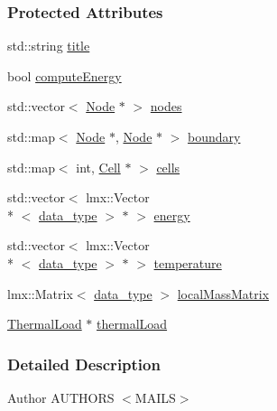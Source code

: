 \subsubsection*{Protected Attributes}
\begin{DoxyCompactItemize}
\item 
std\-::string \hyperlink{classmknix_1_1_thermal_body_ad1b2b790274d2c987a8c461da0a3282f}{title}
\item 
bool \hyperlink{classmknix_1_1_thermal_body_a097e16dfcc1491dc659608f1392a504f}{compute\-Energy}
\item 
std\-::vector$<$ \hyperlink{classmknix_1_1_node}{Node} $\ast$ $>$ \hyperlink{classmknix_1_1_thermal_body_aa74c56a18ed24997dfc4bdb90a7f67bd}{nodes}
\item 
std\-::map$<$ \hyperlink{classmknix_1_1_node}{Node} $\ast$, \hyperlink{classmknix_1_1_node}{Node} $\ast$ $>$ \hyperlink{classmknix_1_1_thermal_body_accad269fb2f0b891c66633011d396cfa}{boundary}
\item 
std\-::map$<$ int, \hyperlink{classmknix_1_1_cell}{Cell} $\ast$ $>$ \hyperlink{classmknix_1_1_thermal_body_a2af2b78c8e31929211f88a5a49072c06}{cells}
\item 
std\-::vector$<$ lmx\-::\-Vector\\*
$<$ \hyperlink{namespacemknix_a16be4b246fbf2cceb141e3a179111020}{data\-\_\-type} $>$ $\ast$ $>$ \hyperlink{classmknix_1_1_thermal_body_aa5aa347f85714ea0766e2c1fddab4dad}{energy}
\item 
std\-::vector$<$ lmx\-::\-Vector\\*
$<$ \hyperlink{namespacemknix_a16be4b246fbf2cceb141e3a179111020}{data\-\_\-type} $>$ $\ast$ $>$ \hyperlink{classmknix_1_1_thermal_body_af5ed33528eba7a3bf39a4bdc3d2c9ed3}{temperature}
\item 
lmx\-::\-Matrix$<$ \hyperlink{namespacemknix_a16be4b246fbf2cceb141e3a179111020}{data\-\_\-type} $>$ \hyperlink{classmknix_1_1_thermal_body_a7ef0f85e0f2dac9fbdb23f23f16abb69}{local\-Mass\-Matrix}
\item 
\hyperlink{classmknix_1_1_thermal_load}{Thermal\-Load} $\ast$ \hyperlink{classmknix_1_1_thermal_body_abbac7355fca5db72ce619bb327c1514c}{thermal\-Load}
\end{DoxyCompactItemize}


\subsubsection{Detailed Description}
\begin{DoxyAuthor}{Author}
A\-U\-T\-H\-O\-R\-S $<$\-M\-A\-I\-L\-S$>$ 
\end{DoxyAuthor}


